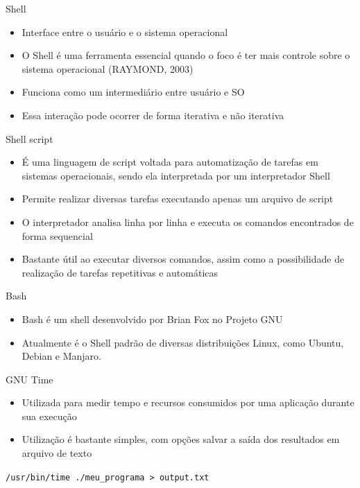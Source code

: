 \begin{frame}{Shell}
    \begin{itemize}
        \item Interface entre o usuário e o sistema operacional
        \item O Shell é uma ferramenta essencial quando o foco é ter mais controle sobre o sistema operacional (RAYMOND, 2003)
        \item Funciona como um intermediário entre usuário e SO
        \item Essa interação pode ocorrer de forma iterativa e não iterativa
    \end{itemize}
\end{frame}

\begin{frame}{Shell script}
    \begin{itemize}
        \item É uma linguagem de script voltada para automatização de tarefas em sistemas operacionais, sendo ela interpretada por um interpretador Shell
        \item Permite realizar diversas tarefas executando apenas um arquivo de script
        \item O interpretador analisa linha por linha e executa os comandos encontrados de forma sequencial
        \item Bastante útil ao executar diversos comandos, assim como a possibilidade de realização de tarefas repetitivas e automáticas
    \end{itemize}
\end{frame}

\begin{frame}{Bash}
    \begin{itemize}
        \item Bash é um shell desenvolvido por Brian Fox no Projeto GNU
        \item Atualmente é o Shell padrão de diversas distribuições Linux, como Ubuntu, Debian e Manjaro.
    \end{itemize}
\end{frame}

\begin{frame}{GNU Time}
    \begin{itemize}
        \item Utilizada para medir tempo e recursos consumidos por uma aplicação durante sua execução
        \item Utilização é bastante simples, com opções salvar a saída dos resultados em arquivo de texto
    \end{itemize}
    
    \begin{center}
        \texttt{/usr/bin/time ./meu\_programa > output.txt}
    \end{center}
\end{frame}

